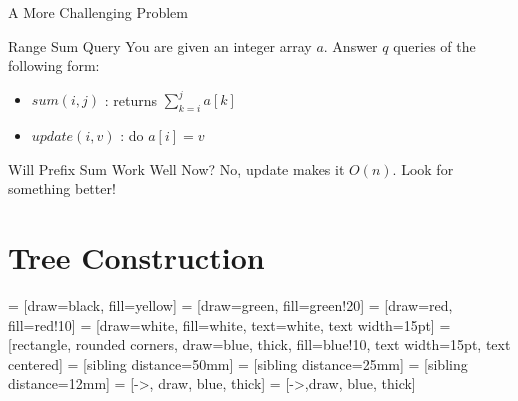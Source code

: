 \documentclass{beamer}
\begin{document}
\begin{frame}{A More Challenging Problem}
    \begin{block}{Range Sum Query}
     You are given an integer array $a$. Answer $q$ queries of the following form: \\
     \centering
     \begin{itemize}
     \item $sum(i, j)$ : returns $\sum_{k=i}^{j} a[k]$
     \pause
     \item $update(i, v)$ : do $a[i] = v$
     \end{itemize}
    \end{block}
    \pause
    \begin{alertblock}{Will Prefix Sum Work Well Now?}
    \pause
    No, update makes it $O(n)$. Look for something better!
    \end{alertblock}
\end{frame}

\section{Tree Construction}
 = [draw=black, fill=yellow]
 = [draw=green, fill=green!20]
 = [draw=red, fill=red!10]
 = [draw=white, fill=white, text=white, text width=15pt]
 = [rectangle, rounded corners, draw=blue, thick, fill=blue!10, text width=15pt, text centered]
 = [sibling distance=50mm]
 = [sibling distance=25mm]
 = [sibling distance=12mm]
 = [->, draw, blue, thick]
 = [->,draw, blue, thick]
\end{document}

